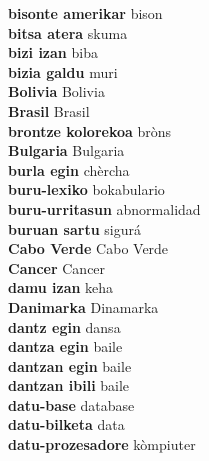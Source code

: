 \textbf{ bisonte amerikar  } bison \\
\textbf{ bitsa atera  } skuma \\
\textbf{ bizi izan  } biba \\
\textbf{ bizia galdu  } muri \\
\textbf{ Bolivia  } Bolivia \\
\textbf{ Brasil  } Brasil \\
\textbf{ brontze kolorekoa  } bròns \\
\textbf{ Bulgaria  } Bulgaria \\
\textbf{ burla egin  } chèrcha \\
\textbf{ buru-lexiko  } bokabulario \\
\textbf{ buru-urritasun  } abnormalidad \\
\textbf{ buruan sartu  } sigurá \\
\textbf{ Cabo Verde  } Cabo Verde \\
\textbf{ Cancer  } Cancer \\
\textbf{ damu izan  } keha \\
\textbf{ Danimarka  } Dinamarka \\
\textbf{ dantz egin  } dansa \\
\textbf{ dantza egin  } baile \\
\textbf{ dantzan egin  } baile \\
\textbf{ dantzan ibili  } baile \\
\textbf{ datu-base  } database \\
\textbf{ datu-bilketa  } data \\
\textbf{ datu-prozesadore  } kòmpiuter \\
